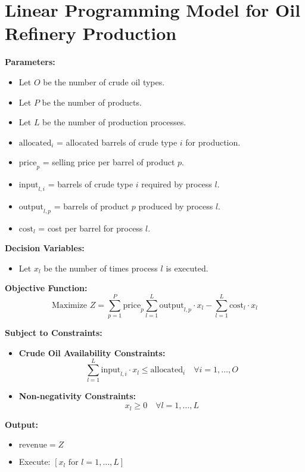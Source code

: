 \documentclass{article}
\begin{document}
\section*{Linear Programming Model for Oil Refinery Production}

\textbf{Parameters:}
\begin{itemize}
    \item Let \( O \) be the number of crude oil types.
    \item Let \( P \) be the number of products.
    \item Let \( L \) be the number of production processes.
    \item \( \text{allocated}_i \) = allocated barrels of crude type \( i \) for production.
    \item \( \text{price}_p \) = selling price per barrel of product \( p \).
    \item \( \text{input}_{l,i} \) = barrels of crude type \( i \) required by process \( l \).
    \item \( \text{output}_{l,p} \) = barrels of product \( p \) produced by process \( l \).
    \item \( \text{cost}_l \) = cost per barrel for process \( l \).
\end{itemize}

\textbf{Decision Variables:}
\begin{itemize}
    \item Let \( x_l \) be the number of times process \( l \) is executed.
\end{itemize}

\textbf{Objective Function:}
\[
\text{Maximize } Z = \sum_{p=1}^{P} \text{price}_p \sum_{l=1}^{L} \text{output}_{l,p} \cdot x_l - \sum_{l=1}^{L} \text{cost}_l \cdot x_l
\]

\textbf{Subject to Constraints:}
\begin{itemize}
    \item \textbf{Crude Oil Availability Constraints:}
    \[
    \sum_{l=1}^{L} \text{input}_{l,i} \cdot x_l \leq \text{allocated}_i \quad \forall i = 1, \ldots, O
    \]
    
    \item \textbf{Non-negativity Constraints:}
    \[
    x_l \geq 0 \quad \forall l = 1, \ldots, L
    \]
\end{itemize}

\textbf{Output:}
\begin{itemize}
    \item \( \text{revenue} = Z \)
    \item Execute: \( [x_l \text{ for } l = 1, \ldots, L] \)
\end{itemize}
\end{document}
